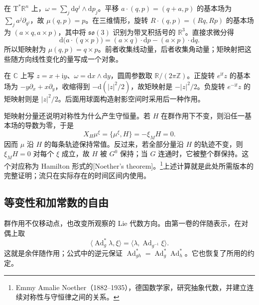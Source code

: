 \begin{example}\label{g4:exm:1001:linear-angular}
	在 \(\mathrm{T}^*\mathbb R^n\) 上，\(\omega=\sum_j\mathrm{d}q^j\wedge\mathrm{d}p_j\)。平移 \(a\cdot(q,p)=(q+a,p)\) 的基本场为 \(\sum_ja^j\partial_{q^j}\)，故 \(\mu(q,p)=p\)。在三维情形，旋转 \(R\cdot(q,p)=(Rq,Rp)\) 的基本场为 \((a\times q,a\times p)\)，其中将 \(\mathfrak{so}(3)\) 识别为带叉积括号的 \(\mathbb R^3\)。直接求微分得
	\[
		\mathrm{d}\bigl(a\cdot(q\times p)\bigr)
		=(a\times q)\cdot\mathrm{d}p-(a\times p)\cdot\mathrm{d}q.
	\]
	所以矩映射为 \(\mu(q,p)=q\times p\)。前者收集线动量，后者收集角动量；矩映射把这些随方向线性变化的量写成一个对象。
\end{example}

\begin{example}\label{g4:exm:1001:circle-sign}
	在 \(\mathbb C\) 上写 \(z=x+\mathrm{i}y\)、\(\omega=\mathrm{d}x\wedge\mathrm{d}y\)，圆周参数取 \(\mathbb R/(2\pi\mathbb Z)\)。正旋转 \(e^{\mathrm{i}t}z\) 的基本场为 \(-y\partial_x+x\partial_y\)，收缩得到 \(-\mathrm{d}(|z|^2/2)\)，故矩映射是 \(-|z|^2/2\)。负旋转 \(e^{-\mathrm{i}t}z\) 的矩映射则是 \(|z|^2/2\)。后面用球面构造射影空间时采用后一种作用。
\end{example}

矩映射分量还说明对称性为什么产生守恒量。若 \(H\) 在群作用下不变，则沿任一基本场的导数为零，于是
\[
	X_H\mu^\xi=\{\mu^\xi,H\}=-\xi_MH=0.
\]
因而 \(\mu\) 沿 \(H\) 的每条轨迹保持常值。反过来，若全部分量沿 \(H\) 的轨迹不变，则 \(\xi_MH=0\) 对每个 \(\xi\) 成立，故 \(H\) 被 \(G^0\) 保持；当 \(G\) 连通时，它被整个群保持。这个对应称为 Hamilton 形式的[Noether's theorem]。\footnote{Emmy Amalie Noether（1882--1935），德国数学家，研究抽象代数，并建立连续对称性与守恒律之间的关系。}上述计算就是此处所需版本的完整证明；流只在实际存在的时间区间内使用。\cite[第5.6节，定理5.18，第155--156页]{Cannas2006Symplectic}

\subsection{等变性和加常数的自由}
\label{g4:subsec:1001:03}

群作用不仅移动点，也改变所观察的 Lie 代数方向。由第一卷的伴随表示，在对偶上取
\begin{equation}\label{g4:eq:1001:coadjoint}
	\langle\operatorname{Ad}_g^*\lambda,\xi\rangle
	=\langle\lambda,\operatorname{Ad}_{g^{-1}}\xi\rangle.
\end{equation}
这就是余伴随作用；公式中的逆元保证 \(\operatorname{Ad}_{gh}^*=\operatorname{Ad}_g^*\operatorname{Ad}_h^*\)。它也恢复了所用的约定。

